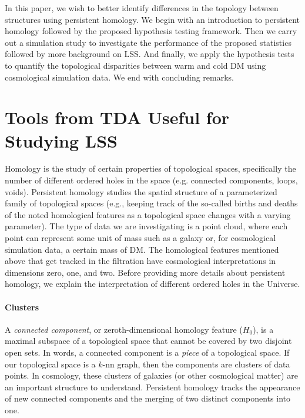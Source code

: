 \documentclass[12pt]{article}
\begin{document}
In this paper, we wish to better identify differences in the topology between structures using persistent homology. We begin with an introduction to persistent homology followed by the proposed hypothesis testing framework. Then we carry out a simulation study to investigate the performance of the proposed statistics followed by more background on LSS. And finally, we apply the hypothesis tests to quantify the topological disparities between warm and cold DM using cosmological simulation data. We end with concluding remarks.



\section{Tools from TDA Useful for Studying LSS}
\label{sec:tda}
Homology is the study of certain properties of topological spaces, specifically the number of different ordered holes in the space (e.g. connected components, loops, voids). Persistent homology studies the spatial structure of a parameterized family of topological spaces (e.g., keeping track of the so-called
births and deaths of the noted homological features as a topological space changes with a varying parameter).
%
The type of data we are investigating is a point cloud, where each point can represent some unit of mass such as a galaxy or, for cosmological simulation data, a certain mass of DM.
The homological features mentioned above that get tracked in the filtration have cosmological interpretations in dimensions zero, one, and two.  Before providing more details about persistent homology, we explain the interpretation of different ordered holes in the Universe.

\paragraph{Clusters}
A \emph{connected component}, or zeroth-dimensional homology feature ($H_0$), is a maximal subspace of a topological space that cannot be covered by two disjoint open sets. In words, a connected component is a \textit{piece} of a topological space.  If our topological space is a $k$-nn graph, then the components are clusters of data points. In cosmology, these clusters of galaxies (or other cosmological matter) are an important structure to understand. Persistent homology tracks the appearance of new connected components and the merging of two distinct components into one.
\end{document}
